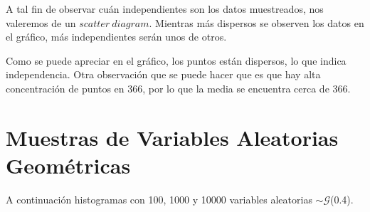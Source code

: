\documentclass[a4paper,10pt]{article}
\begin{document}
A tal fin de observar cuán independientes son los datos muestreados, nos valeremos de un $scatter \ diagram$.
Mientras más dispersos se observen los datos en el gráfico, más independientes serán unos de otros.


\begin{figure}[hbt]
\noindent{}
\end{figure}

Como se puede apreciar en el gráfico, los puntos están dispersos, lo que indica independencia.
Otra observación que se puede hacer que es que hay alta concentración de puntos en 366, por lo que la media
se encuentra cerca de 366.

\pagebreak

\section{Muestras de Variables Aleatorias Geométricas}

A continuación histogramas con 100, 1000 y 10000 variables aleatorias $\sim \mathcal{G}$(0.4).


\begin{figure}[hbt]
\noindent{}
\end{figure}
\end{document}

